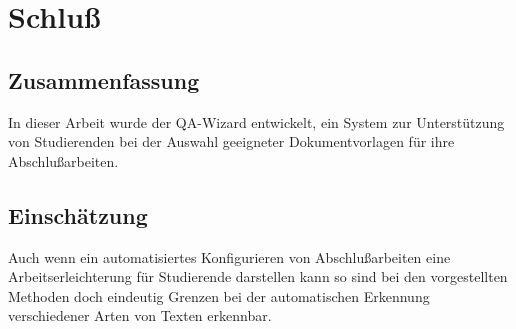 \documentclass[12pt,        %
  english,ngerman,          %
  paper=a4,                 %
  captions=tablesignature,  %
  listof=numbered,          %
  bibliography=totoc,       %
  headings=small,           %
  headinclude=false,        %
  footinclude=false,        %
  parskip=half-,            %
  oneside,                  %
  DIV=12                    %
  ]{scrbook}                %
\begin{document}
\chapter{Schluß}\label{chapter:conclusions}


\section{Zusammenfassung}\label{sec:conc_summary}


In dieser Arbeit wurde der QA-Wizard entwickelt, ein System zur Unterstützung von Studierenden bei
der Auswahl geeigneter Dokumentvorlagen für ihre Abschlußarbeiten.

\section{Einschätzung}\label{sec:conc_assessment}


Auch wenn ein automatisiertes Konfigurieren von Abschlußarbeiten eine Arbeitserleichterung für Studierende darstellen kann so sind bei den vorgestellten Methoden doch eindeutig Grenzen bei der automatischen Erkennung verschiedener Arten von Texten erkennbar.


\backmatter

  \cleardoublepage
  \listoffigures

  \cleardoublepage
  \listoftables
\end{document}
